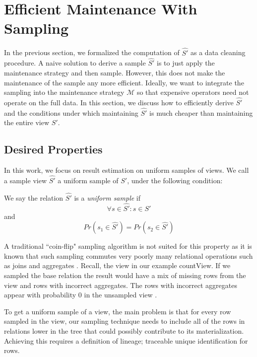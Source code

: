 \section{Efficient Maintenance With Sampling} \label{sampling}
In the previous section, we formalized the computation of $\hat{S'}$  as a data cleaning procedure.
A naive solution to derive a sample $\hat{S'}$ is to just apply the maintenance strategy and then sample.
However, this does not make the maintenance of the sample any more efficient.
Ideally, we want to integrate the sampling into the maintenance strategy $\mathcal{M}$ so that expensive operators
need not operate on the full data.
In this section, we discuss how to efficiently derive $\hat{S'}$ and the conditions under which
maintaining $\hat{S'}$ is much cheaper than maintaining the entire view $S'$.

\subsection{Desired Properties}
In this work, we focus on result estimation on uniform samples of views. 
We call a sample view $\hat{S'}$ a uniform sample of $S'$, under the following condition:
\begin{definition} We say the relation $\hat{S'}$ is a \emph{uniform sample} if
\[ \forall s \in \hat{S'} : s \in S' \]
and
\[Pr(s_1 \in \hat{S'}) =  Pr(s_2 \in \hat{S'}) \]
\end{definition}
A traditional ``coin-flip" sampling algorithm is not suited for this property as it is known that such sampling commutes very poorly many relational operations such as joins and aggregates \cite{chaudhuri1999random}.
Recall, the view in our example \textsf{countView}. 
If we sampled the base relation the result would have a mix of missing rows from the view and rows with incorrect aggregates.
The rows with incorrect aggregates appear with probability 0 in the unsampled view . 

To get a uniform sample of a view, the main problem is that for every row sampled in the view, our sampling technique needs to include all of the rows in relations lower in the tree  that could possibly contribute to its materialization.
Achieving this requires a definition of lineage; traceable unique identification for rows.

